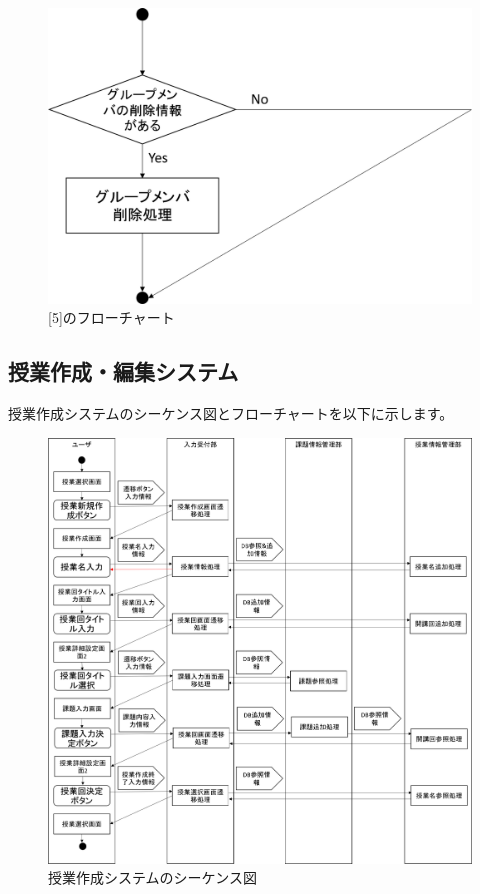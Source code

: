 \begin{figure}[htbp]
  \begin{center}
    \includegraphics[width=0.5\linewidth,clip]{./img/edit_group/sub5.png}
    \caption{[5]のフローチャート}\label{fig:editgroupflow1}
  \end{center}
\end{figure}


\newpage
\subsection{授業作成・編集システム}
授業作成システムのシーケンス図とフローチャートを以下に示します。

\begin{figure}[htbp]
  \begin{center}
    \includegraphics[width=1\linewidth,clip]{./img/create_lecture/main.png}
    \caption{授業作成システムのシーケンス図}\label{fig:createlectureseaquence}
  \end{center}
\end{figure}

